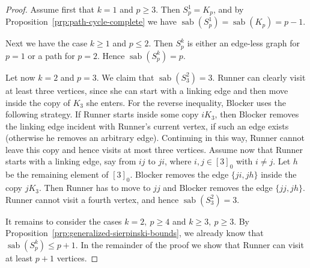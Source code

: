 \documentclass[12pt]{article}
\DeclareMathOperator{\sab}{\mathrm{sab}}
\begin{document}
\begin{proof}
Assume first that $k=1$ and $p\ge 3$. Then $S_p^1=K_p$, and by Proposition~\ref{prp:path-cycle-complete} we have $\sab(S_p^1)=\sab(K_p)=p-1$.

Next we have the case $k \geq 1$ and $p\le 2$. Then $S^k_p$ is either an edge-less graph for $p=1$ or a path for $p=2$. Hence $\sab(S_p^k)=p$.

Let now $k=2$ and $p=3$. We claim that $\sab(S_3^2)=3$. Runner can clearly visit at least three vertices, since she can start with a linking edge and then move inside the copy of $K_3$ she enters. For the reverse inequality, Blocker uses the following strategy. If Runner starts inside some copy $iK_3$, then Blocker removes the linking edge incident with Runner's current vertex, if such an edge exists (otherwise he removes an arbitrary edge). Continuing in this way, Runner cannot leave this copy and hence visits at most three vertices. Assume now that Runner starts with a linking edge, say from $ij$ to $ji$, where $i,j \in [3]_0$ with $i\ne j$. Let $h$ be the remaining element of $[3]_0$. Blocker removes the edge $\{ji,jh\}$ inside the copy $jK_3$. Then Runner has to move to $jj$ and Blocker removes the edge $\{jj,jh\}$. Runner cannot visit a fourth vertex, and hence $\sab(S_3^2)=3$.

It remains to consider the cases $k=2,\ p\ge 4$ and $k\ge 3,\ p\ge 3$. By Proposition~\ref{prp:generalized-sierpinski-bounds}, we already know that $\sab(S_p^k)\le p+1$. In the remainder of the proof we show that Runner can visit at least $p+1$ vertices.


\end{proof}
\end{document}
